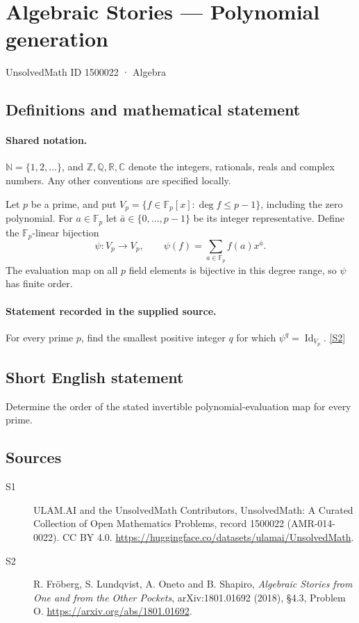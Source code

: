 \documentclass[11pt]{article}
\newcommand{\sref}[2]{\hyperlink{source:#1:#2}{[S#2]}}
\begin{document}
\setcounter{section}{1500021}
\section{Algebraic Stories — Polynomial generation}\label{1500022}
{\small\sffamily UnsolvedMath ID 1500022 · Algebra}
\subsection{Definitions and mathematical statement}

\paragraph{Shared notation.}$\mathbb N=\{1,2,\ldots\}$, and $\mathbb Z,\mathbb Q,\mathbb R,\mathbb C$ denote the integers, rationals, reals and complex numbers. Any other conventions are specified locally.


Let $p$ be a prime, and put $V_p=\{f\in\mathbb F_p[x]:\deg f\leq p-1\}$, including the zero polynomial. For $a\in\mathbb F_p$ let $\bar a\in\{0,\ldots,p-1\}$ be its integer representative. Define the $\mathbb F_p$-linear bijection
\[\psi:V_p\longrightarrow V_p,\qquad\psi(f)=\sum_{a\in\mathbb F_p}f(a)x^{\bar a}.
\]
The evaluation map on all $p$ field elements is bijective in this degree range, so $\psi$ has finite order.
\paragraph{Statement recorded in the supplied source.}
For every prime $p$, find the smallest positive integer $q$ for which $\psi^q=\operatorname{Id}_{V_p}$. \sref{1500022}{2}
\subsection{Short English statement}
Determine the order of the stated invertible polynomial-evaluation map for every prime.
\subsection{Sources}
\begin{description}
\item[\hypertarget{source:1500022:1}{S1}] ULAM.AI and the UnsolvedMath Contributors, UnsolvedMath: A Curated Collection of Open Mathematics Problems, record 1500022 (AMR-014-0022). CC BY 4.0. \url{https://huggingface.co/datasets/ulamai/UnsolvedMath}.
\item[\hypertarget{source:1500022:2}{S2}] R. Fröberg, S. Lundqvist, A. Oneto and B. Shapiro, \emph{Algebraic Stories from One and from the Other Pockets}, arXiv:1801.01692 (2018), §4.3, Problem O. \url{https://arxiv.org/abs/1801.01692}.
\end{description}
\label{end:1500022}
\end{document}
